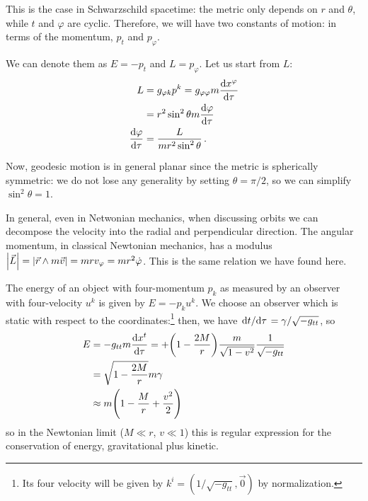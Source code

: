 \documentclass[main.tex]{subfiles}
\begin{document}
This is the case in Schwarzschild spacetime: the metric only depends on \(r\) and \(\theta \), while \(t\) and \(\varphi \) are cyclic. 
Therefore, we will have two constants of motion: in terms of the momentum, \(p_t\) and \(p_{\varphi }\). 

We can denote them as \(E = - p_t\) and \(L = p_\varphi \). 
Let us start from \(L\):
%
\begin{align}
L &= g_{\varphi k} p^{k} = g_{\varphi \varphi } m \dv{x^{\varphi }}{\tau }  \\
&= r^2 \sin^2 \theta m \dv{\varphi }{\tau } \\
\dv{\varphi }{\tau } &= \frac{L}{m r^2 \sin^2 \theta }
\,.
\end{align}

Now, geodesic motion is in general planar since the metric is spherically symmetric: we do not lose any generality by setting \(\theta = \pi /2\), so we can simplify \(\sin^2 \theta = 1\).

In general, even in Netwonian mechanics, when discussing orbits we can decompose the velocity into the radial and perpendicular direction. 
The angular momentum, in classical Newtonian mechanics, has a modulus \( \abs{\vec{L}} = \abs{\vec{r} \wedge m \vec{v}} = mr v_\varphi = mr^2 \dot{\varphi} \). This is the same relation we have found here.  

The energy of an object with four-momentum \(p_k\) as measured by an observer with four-velocity \(u^{k}\) is given by \(E = - p_k u^{k}\). 
We choose an observer which is static with respect to the coordinates:\footnote{Its four velocity will be given by \(k^{i} = (1 / \sqrt{-g_{tt}}, \vec{0})\) by normalization.}
then, we have \(\dv*{t}{\tau } = \gamma / \sqrt{- g_{tt}} \), so
%
\begin{align}
E &= -g_{tt} m \dv{x^{t}}{\tau } = 
+ \qty(1 - \frac{2M}{r}) \frac{m}{\sqrt{1 - v^2}} \frac{1}{\sqrt{- g_{tt}}} \\ 
&= \sqrt{1 - \frac{2M}{r}} m \gamma 
 \\
&\approx m \qty(1 - \frac{M}{r} + \frac{v^2}{2})
\,
\end{align}
%
so in the Newtonian limit (\(M \ll r\), \(v \ll 1\)) this is regular expression for the conservation of energy, gravitational plus kinetic.
\end{document}
